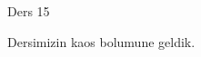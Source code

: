 \documentclass[12pt,fleqn]{article}\usepackage{../../common}
\begin{document}
Ders 15

Dersimizin kaos bolumune geldik. 
\end{document}
